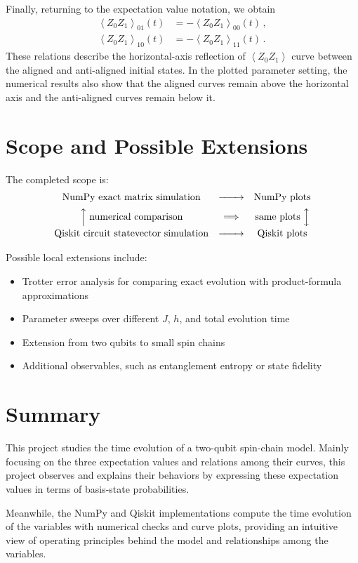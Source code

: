 \documentclass[11pt]{article}
\numberwithin{equation}{section}
\newcommand{\ev}[1]{\left\langle #1 \right\rangle} %
\begin{document}
Finally, returning to the expectation value notation, we obtain
\begin{subequations}
    \begin{align}
    \ev{Z_0Z_1}_{01}(t) &= -\ev{Z_0Z_1}_{00}(t) \,, \\
    \ev{Z_0Z_1}_{10}(t) &= -\ev{Z_0Z_1}_{11}(t) \,.
    \end{align}
\end{subequations}
These relations describe the horizontal-axis reflection of $\ev{Z_0Z_1}$ curve between the aligned and anti-aligned initial states. In the plotted parameter setting, the numerical results also show that the aligned curves remain above the horizontal axis and the anti-aligned curves remain below it.





\section{Scope and Possible Extensions}
The completed scope is:
\begin{align*}
\begin{array}{ccc}
  \text{NumPy exact matrix simulation}
  & \xrightarrow{\hspace{0.7cm}} & \text{NumPy plots} \\[0.5em]
  \Big\uparrow \; {\text{numerical comparison}}
  & \Longrightarrow & {\text{same plots}} \; \Big\updownarrow \\[0.5em]
  \text{Qiskit circuit statevector simulation}
  & \xrightarrow{\hspace{0.7cm}} & \text{Qiskit plots}
\end{array}
\end{align*}

Possible local extensions include:
\begin{itemize}
  \item Trotter error analysis for comparing exact evolution with
    product-formula approximations
  \item Parameter sweeps over different $J$, $h$, and total evolution time
  \item Extension from two qubits to small spin chains
  \item Additional observables, such as entanglement entropy or state fidelity
\end{itemize}






\section{Summary}
This project studies the time evolution of a two-qubit spin-chain model. Mainly focusing on the three expectation values and relations among their curves, this project observes and explains their behaviors by expressing these expectation values in terms of basis-state probabilities.

Meanwhile, the NumPy and Qiskit implementations compute the time evolution of the variables with numerical checks and curve plots, providing an intuitive view of operating principles behind the model and relationships among the variables.
\end{document}

